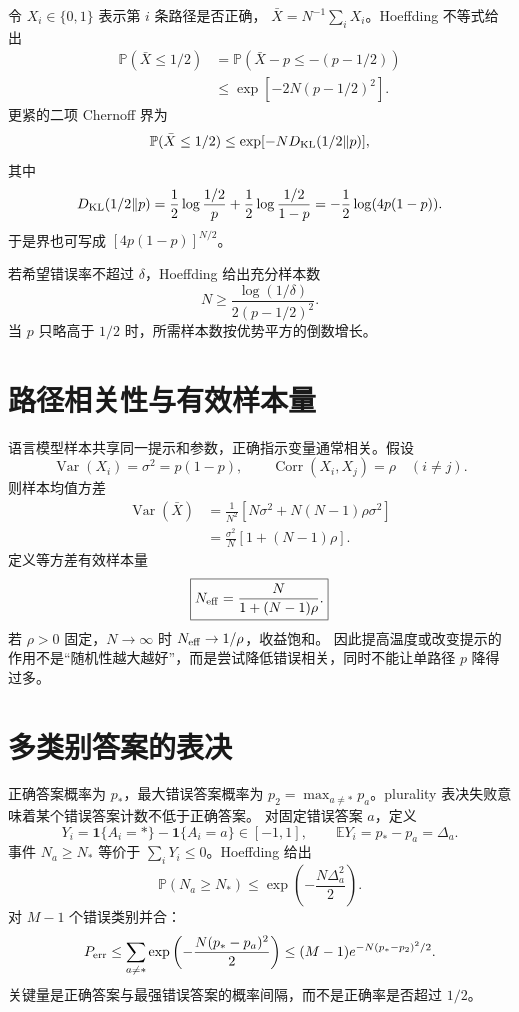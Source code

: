 \documentclass[11pt]{article}
\numberwithin{equation}{section}
\newcommand{\E}{\mathbb{E}}
\newcommand{\Pp}{\mathbb{P}}
\newcommand{\1}{\mathbf{1}}
\newcommand{\Var}{\operatorname{Var}}
\begin{document}
令 $X_i\in\{0,1\}$ 表示第 $i$ 条路径是否正确，
$\bar X=N^{-1}\sum_iX_i$。Hoeffding 不等式给出
\begin{align}
 \Pp(\bar X\le1/2)
 &=\Pp(\bar X-p\le-(p-1/2))\\
 &\le\exp[-2N(p-1/2)^2].
\end{align}
更紧的二项 Chernoff 界为
\begin{equation}
 \Pp(\bar X\le1/2)
 \le\exp[-N D_{\rm KL}(1/2\|p)],
\end{equation}
其中
\begin{equation}
 D_{\rm KL}(1/2\|p)
 =\frac12\log\frac{1/2}{p}+\frac12\log\frac{1/2}{1-p}
 =-\frac12\log(4p(1-p)).
\end{equation}
于是界也可写成 $[4p(1-p)]^{N/2}$。

若希望错误率不超过 $\delta$，Hoeffding 给出充分样本数
\begin{equation}
 N\ge\frac{\log(1/\delta)}{2(p-1/2)^2}.
\end{equation}
当 $p$ 只略高于 $1/2$ 时，所需样本数按优势平方的倒数增长。

\section{路径相关性与有效样本量}

语言模型样本共享同一提示和参数，正确指示变量通常相关。假设
\begin{equation}
 \Var(X_i)=\sigma^2=p(1-p),\qquad
 \operatorname{Corr}(X_i,X_j)=\rho\quad(i\ne j).
\end{equation}
则样本均值方差
\begin{align}
 \Var(\bar X)
 &=\frac1{N^2}\left[N\sigma^2+N(N-1)\rho\sigma^2\right]\\
 &=\frac{\sigma^2}{N}[1+(N-1)\rho].
\end{align}
定义等方差有效样本量
\begin{equation}
 \boxed{N_{\rm eff}=\frac{N}{1+(N-1)\rho}.}
\end{equation}
若 $\rho>0$ 固定，$N\to\infty$ 时 $N_{\rm eff}\to1/\rho$，收益饱和。
因此提高温度或改变提示的作用不是“随机性越大越好”，而是尝试降低错误相关，同时不能让单路径 $p$ 降得过多。

\section{多类别答案的表决}

正确答案概率为 $p_*$，最大错误答案概率为
$p_2=\max_{a\ne *}p_a$。plurality 表决失败意味着某个错误答案计数不低于正确答案。
对固定错误答案 $a$，定义
\begin{equation}
 Y_i=\1\{A_i=*\}-\1\{A_i=a\}\in[-1,1],\qquad
 \E Y_i=p_*-p_a=\Delta_a.
\end{equation}
事件 $N_a\ge N_*$ 等价于 $\sum_iY_i\le0$。Hoeffding 给出
\begin{equation}
 \Pp(N_a\ge N_*)\le\exp\left(-\frac{N\Delta_a^2}{2}\right).
\end{equation}
对 $M-1$ 个错误类别并合：
\begin{equation}
 P_{\rm err}\le\sum_{a\ne *}
 \exp\left(-\frac{N(p_*-p_a)^2}{2}\right)
 \le(M-1)e^{-N(p_*-p_2)^2/2}.
\end{equation}
关键量是正确答案与最强错误答案的概率间隔，而不是正确率是否超过 $1/2$。
\end{document}

